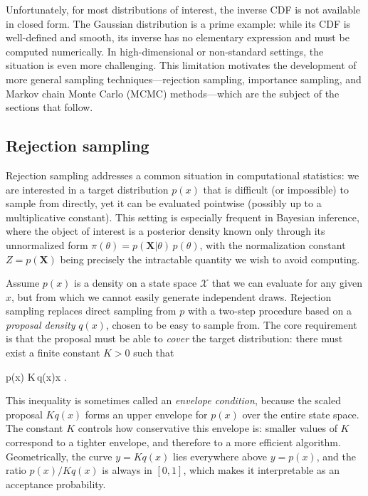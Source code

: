 Unfortunately, for most distributions of interest, the inverse CDF is not available in closed form. The Gaussian distribution is a prime example: while its CDF is well-defined and smooth, its inverse has no elementary expression and must be computed numerically. In high-dimensional or non-standard settings, the situation is even more challenging. This limitation motivates the development of more general sampling techniques---rejection sampling, importance sampling, and Markov chain Monte Carlo (MCMC) methods---which are the subject of the sections that follow.

\medskip
\subsection*{Rejection sampling}

Rejection sampling addresses a common situation in computational statistics: we are interested in a target distribution $p(x)$ that is difficult (or impossible) to sample from directly, yet it can be evaluated pointwise (possibly up to a multiplicative constant). This setting is especially frequent in Bayesian inference, where the object of interest is a posterior density known only through its unnormalized form $\pi(\theta) = p(\mathbf{X}|\theta)\,p(\theta)$, with the normalization constant $Z = p(\mathbf{X})$ being precisely the intractable quantity we wish to avoid computing.

Assume $p(x)$ is a density on a state space $\mathcal{X}$ that we can evaluate for any given $x$, but from which we cannot easily generate independent draws. Rejection sampling replaces direct sampling from $p$ with a two-step procedure based on a \emph{proposal density} $q(x)$, chosen to be easy to sample from. The core requirement is that the proposal must be able to \emph{cover} the target distribution: there must exist a finite constant $K > 0$ such that
\begin{myequation}
p(x) \le K\,q(x)\qquad \forall x \in {}.
\end{myequation}
This inequality is sometimes called an \emph{envelope condition}, because the scaled proposal $Kq(x)$ forms an upper envelope for $p(x)$ over the entire state space. The constant $K$ controls how conservative this envelope is: smaller values of $K$ correspond to a tighter envelope, and therefore to a more efficient algorithm. Geometrically, the curve $y = Kq(x)$ lies everywhere above $y = p(x)$, and the ratio $p(x)/Kq(x)$ is always in $[0,1]$, which makes it interpretable as an acceptance probability.

